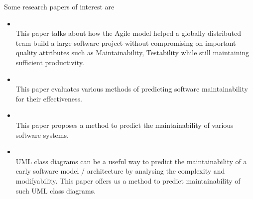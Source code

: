 \documentclass[dvips,12pt]{article}
\begin{document}
Some research papers of interest are 

\begin{itemize}
\item {} \cite{sutherland_distributed_2007}\\
 This paper talks about how the Agile model helped a globally distributed team build a large software project without compromising on important quality attributes such as Maintainability, Testability while still maintaining sufficient productivity. 

\item {} \cite{riaz_systematic_2009} \\
This paper evaluates various methods of predicting software maintainability for their effectiveness. 

\item {} \cite{hayes_maintainability_2005} \\
This paper proposes a method to predict the maintainability of various software systems. 

\item {} \cite{genero_building_2007} \\
UML class diagrams can be a useful way to predict the maintainability of a early software model / architecture by analysing the complexity and modifyability. This paper offers us a method to predict maintainability of such UML class diagrams.

\end{itemize}




\end{document}
